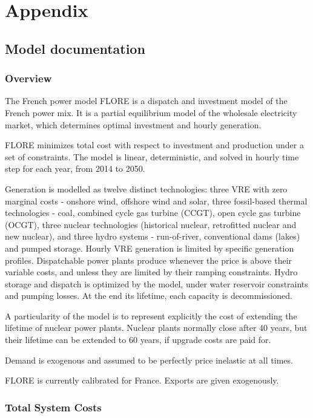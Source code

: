 \section{Appendix}

\subsection{Model documentation}

\subsubsection{Overview}
The French power model FLORE is a dispatch and investment model of the French power mix. It is a partial equilibrium model of the wholesale electricity market, which determines optimal investment and hourly generation.

FLORE minimizes total cost with respect to investment and production under a set of constraints. The model is linear, deterministic, and solved in hourly time step for each year, from 2014 to 2050.

Generation is modelled as twelve distinct technologies: three VRE with zero marginal costs - onshore wind, offshore wind and solar, three fossil-based thermal technologies - coal, combined cycle gas turbine (CCGT), open cycle gas turbine (OCGT), three nuclear technologies (historical nuclear, retrofitted nuclear and new nuclear), and three hydro systems - run-of-river, conventional dams (lakes) and pumped storage. 
Hourly VRE generation is limited by specific generation profiles.
Dispatchable power plants produce whenever the price is above their variable costs, and unless they are limited by their ramping constraints.
Hydro storage and dispatch is optimized by the model, under water reservoir constraints and pumping losses.
At the end its lifetime, each capacity is decommissioned.

A particularity of the model is to represent explicitly the cost of extending the lifetime of nuclear power plants. Nuclear plants normally close after 40 years, but their lifetime can be extended to 60 years, if upgrade costs are paid for.

Demand is exogenous and assumed to be perfectly price inelastic at all times.

FLORE is currently calibrated for France. Exports are given exogenously.

\subsubsection{Total System Costs}

